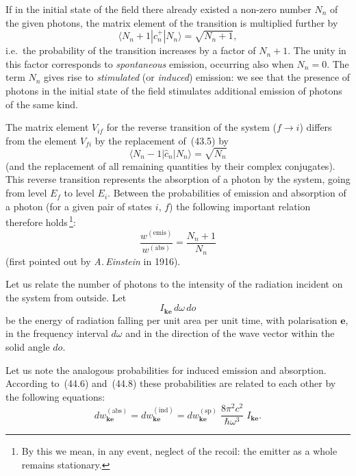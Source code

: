 If in the initial state of the field there already existed a non-zero number $N_n$ of the given photons, the matrix element of the transition is multiplied further by
\begin{equation}
\langle N_n + 1|\widehat c^+_n|N_n\rangle = \sqrt{N_n + 1},
\tag{44.5}
\end{equation}
i.e.\ the probability of the transition increases by a factor of $N_n + 1$. The unity in this factor corresponds to \textit{spontaneous} emission, occurring also when $N_n = 0$. The term $N_n$ gives rise to \textit{stimulated} (or \textit{induced}) emission: we see that the presence of photons in the initial state of the field stimulates additional emission of photons of the same kind.

The matrix element $V_{if}$ for the reverse transition of the system ($f\to i$) differs from the element $V_{fi}$ by the replacement of~(43.5) by
\[
\langle N_n - 1|\widehat c_n|N_n\rangle = \sqrt{N_n}
\]
(and the replacement of all remaining quantities by their complex conjugates). This reverse transition represents the absorption of a photon by the system, going from level $E_f$ to level $E_i$. Between the probabilities of emission and absorption of a photon (for a given pair of states $i$, $f$) the following important relation therefore holds\,\footnote{By this we mean, in any event, neglect of the recoil: the emitter as a whole remains stationary.}:
\begin{equation}
\frac{w^{(\mathrm{emis})}}{w^{(\mathrm{abs})}} = \frac{N_n + 1}{N_n}
\tag{44.6}
\end{equation}
(first pointed out by \textit{A.\,Einstein} in 1916).

Let us relate the number of photons to the intensity of the radiation incident on the system from outside. Let
\begin{equation}
I_{\mathbf{k}\mathbf{e}}\,d\omega\,do
\tag{44.7}
\end{equation}
be the energy of radiation falling per unit area per unit time, with polarisation $\mathbf{e}$, in the frequency interval $d\omega$ and in the direction of the wave vector within the solid angle $do$.

Let us note the analogous probabilities for induced emission and absorption. According to~(44.6) and~(44.8) these probabilities are related to each other by the following equations:
\begin{equation}
dw^{(\mathrm{abs})}_{\mathbf{k}\mathbf{e}} = dw^{(\mathrm{ind})}_{\mathbf{k}\mathbf{e}} = dw^{(\mathrm{sp})}_{\mathbf{k}\mathbf{e}}\;\frac{8\pi^2c^2}{\hbar\omega^3}\;I_{\mathbf{k}\mathbf{e}}.
\tag{44.9}
\end{equation}

